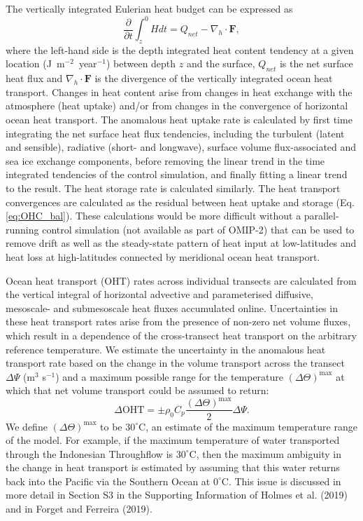 \documentclass{nature}
\begin{document}
\begin{methods}
		The vertically integrated Eulerian heat budget can be expressed as
		\begin{equation}
		\frac{\partial}{\partial t} \int_{z}^{0} H dt = Q_{net} -  \nabla_{h}\cdot \bm{F}, \label{eq:OHC_bal}
		\end{equation} 
		where the left-hand side is the depth integrated heat content tendency at a given location (J~m$^{-2}$~year$^{-1}$) between depth $z$ and the surface, $Q_{net}$ is the net surface heat flux and $\nabla_{h}\cdot \bm{F}$ is the divergence of the vertically integrated ocean heat transport. Changes in heat content arise from changes in heat exchange with the atmosphere (heat uptake) and/or from changes in the convergence of horizontal ocean heat transport. The anomalous heat uptake rate is calculated by first time integrating the net surface heat flux tendencies, including the turbulent (latent and sensible), radiative (short- and longwave), surface volume flux-associated and sea ice exchange components, before removing the linear trend in the time integrated tendencies of the control simulation, and finally fitting a linear trend to the result. The heat storage rate is calculated similarly. The heat transport convergences are calculated as the residual between heat uptake and storage (Eq. \ref{eq:OHC_bal}). These calculations would be more difficult without a parallel-running control simulation (not available as part of OMIP-2) that can be used to remove drift as well as the steady-state pattern of heat input at low-latitudes and heat loss at high-latitudes connected by meridional ocean heat transport.
		
		Ocean heat transport (OHT) rates across individual transects are calculated from the vertical integral of horizontal advective and parameterised diffusive, mesoscale- and submesoscale heat fluxes accumulated online. Uncertainties in these heat transport rates arise from the presence of non-zero net volume fluxes, which result in a dependence of the cross-transect heat transport on the arbitrary reference temperature\cite{holmes2019atlantic,forget2019OHT}. We estimate the uncertainty in the anomalous heat transport rate based on the change in the volume transport across the transect $\Delta\Psi$ (m$^{3}$ s$^{-1}$) and a maximum possible range for the temperature $(\Delta\Theta)^{\text{max}}$ at which that net volume transport could be assumed to return:
		\begin{equation}
		\Delta\text{OHT} = \pm \rho_0 C_p \frac{(\Delta\Theta)^{\text{max}}}{2} \Delta\Psi.
		\end{equation}
		We define $(\Delta\Theta)^{\text{max}}$ to be $30^{\circ}$C, an estimate of the maximum temperature range of the model. For example, if the maximum temperature of water transported through the Indonesian Throughflow is $30^{\circ}$C, then the maximum ambiguity in the change in heat transport is estimated by assuming that this water returns back into the Pacific via the Southern Ocean at $0^{\circ}$C. This issue is discussed in more detail in Section S3 in the Supporting Information of Holmes et al. (2019)\cite{holmes2019atlantic} and in Forget and Ferreira (2019)\cite{forget2019OHT}.
		

\end{methods}
\end{document}
